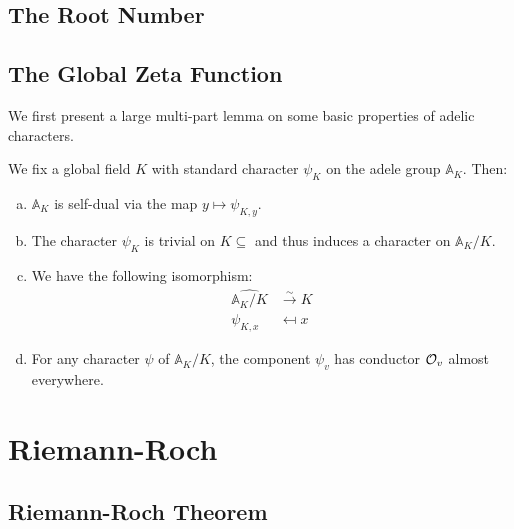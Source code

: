 \documentclass[11pt, x11names, openany]{book}
\renewcommand{\aa}{\mathbb{A}}
\newcommand{\bij}{\overset{\sim}{\to}}
\renewcommand{\hat}{\widehat}
\begin{document}
\subsection{The Root Number}
\label{subsection: The Root Number}


\subsection{The Global Zeta Function}
\label{subsection: global zeta function}

\begin{defn}
\label{def: adele standard character}

\end{defn}

We first present a large multi-part lemma on some basic properties of adelic characters.
\begin{lemma}
\label{lemma: properties of adelic characters}
We fix a global field $K$ with standard character $\psi_K$ on the adele group $\aa_K$. Then:
\begin{enumerate}[(a)]
    \item \label{thmitem: adele group self-duality} $\aa_K$ is self-dual via the map $y \mapsto \psi_{K, y}$.
    \item \label{thmitem: triviality of adele character on K} The character $\psi_K$ is trivial on $K \subseteq $ and thus induces a character on $\aa_K/K$.
    \item \label{thmitem: duality of A_K/K} We have the following isomorphism:
    \begin{align}
        \label{eqn: A_K/K and K pontryagin duality}
        \hat{\aa_K/K} & \bij K \nonumber \\
        \psi_{K, x} & \mapsfrom x
    \end{align}
    \item \label{thmitem: character has O_v conductor almost everywhere} For any character $\psi$ of $\aa_K/K$, the component $\psi_v$ has conductor $\mathcal{O}_v$ almost everywhere.
\end{enumerate}
\end{lemma}

\section{Riemann-Roch}
\label{section: Riemann-roch}



\subsection{Riemann-Roch Theorem}
\label{subsection: Riemann-Roch}
\end{document}
